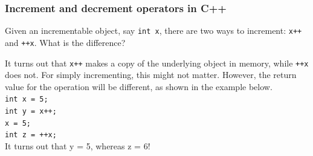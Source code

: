 \subsubsection{Increment and decrement operators in C++}

Given an incrementable object, say \texttt{int x}, there are two ways to increment: \texttt{x++} and \texttt{++x}. What is the difference?

It turns out that \texttt{x++} makes a copy of the underlying object in memory, while \texttt{++x} does not. For simply incrementing, this might not matter. However, the return value for the operation will be different, as shown in the example below. \\

\indent \indent \texttt{int x = 5;} \\
\indent \indent \texttt{int y = x++;} \\
\indent \indent \texttt{x = 5;} \\
\indent \indent \texttt{int z = ++x;} \\

It turns out that y = 5, whereas z = 6!